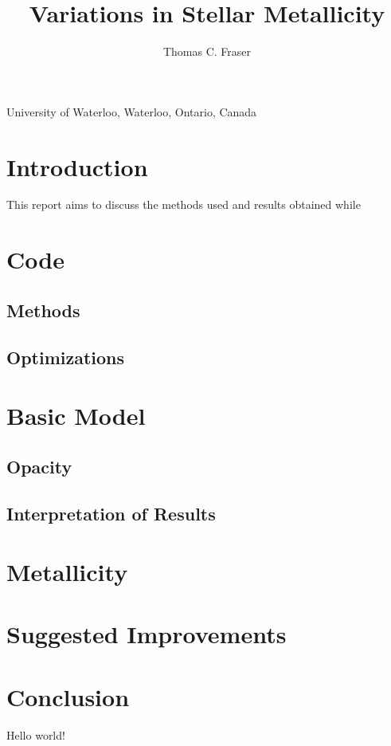 \documentclass[11pt]{article}
\begin{document}
    \title{Variations in Stellar Metallicity}
    \author[20460785]{Thomas C. Fraser}{University of Waterloo, Waterloo, Ontario, Canada}
    \section*{Introduction}
    This report aims to discuss the methods used and results obtained while
    \section{Code}
    \subsection{Methods}
    \subsection{Optimizations}
    \section{Basic Model}
    \subsection{Opacity}
    \subsection{Interpretation of Results}
    \section{Metallicity}
    \section{Suggested Improvements}
    \section{Conclusion}
    Hello world!
\end{document}
